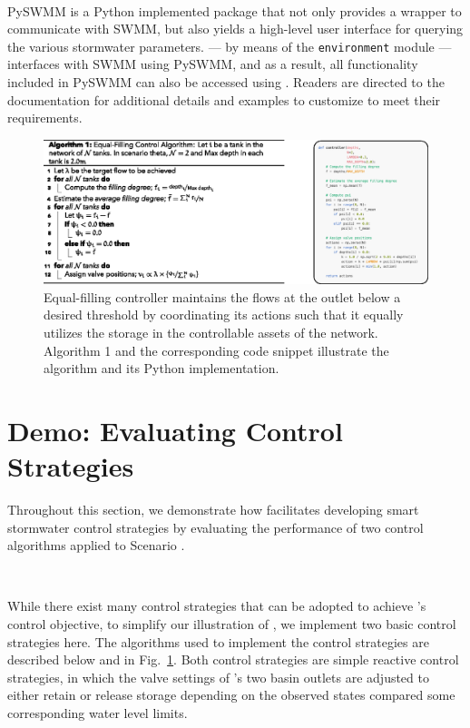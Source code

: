 \

PySWMM is a Python implemented package that not only provides a wrapper to communicate with SWMM, but also yields a high-level user interface for querying the various stormwater parameters. \pystorms --- by means of the \texttt{environment} module --- interfaces with SWMM using PySWMM, and as a result, all functionality included in PySWMM can also be accessed using \pystormsNOSPACE. Readers are directed to the documentation for additional details and examples to customize \pystorms to meet their requirements. 
%
%
%
\begin{figure}
    \centering
    \includegraphics[width=\linewidth]{gfx/Chapter-5/algo.eps}
    \caption{Equal-filling controller maintains the flows at the outlet below a desired threshold by coordinating its actions such that it equally utilizes the storage in the controllable assets of the network.
    Algorithm 1 and the corresponding code snippet illustrate the algorithm and its Python implementation.}\label{fig:eqf}
\end{figure}
%
%
%
%
%
%
%
%
%
%
%
%
%
%
%
\section{Demo: Evaluating Control Strategies}
\label{sec:evaluatingcontrolstrategies}
%
%
%
Throughout this section, we demonstrate how \pystorms facilitates developing smart stormwater control strategies by evaluating the performance of two control algorithms applied to Scenario .

\

While there exist many control strategies that can be adopted to achieve 's control objective, to simplify our illustration of \pystormsNOSPACE, we implement two basic control strategies here. The algorithms used to implement the control strategies are described below and in Fig.~\ref{fig:eqf}. Both control strategies are simple reactive control strategies, in which the valve settings of 's two basin outlets are adjusted to either retain or release storage depending on the observed states compared some corresponding water level limits. 
%
%
%
